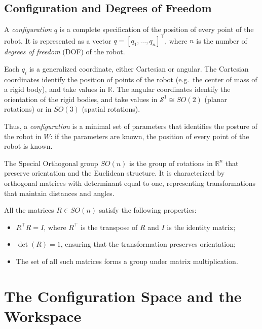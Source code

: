 \subsection{Configuration and Degrees of Freedom}
\label{sec:configuration-dof}

\begin{definition}[Configuration]
A \emph{configuration} \( q \) is a complete specification of the
position of every point of the robot. It is represented as a vector
\( q = [q_1, \dots, q_n]^\top \), where \( n \) is the number of
\emph{degrees of freedom} (DOF) of the robot.
\end{definition}

Each \( q_i \) is a generalized coordinate, either Cartesian or
angular. The Cartesian coordinates identify the position of points of
the robot (e.g.\ the center of mass of a rigid body), and take values
in \( \mathbb{R} \). The angular coordinates identify the orientation
of the rigid bodies, and take values in \( \mathcal{S}^1 \cong SO(2) \)
(planar rotations) or in \( SO(3) \) (spatial rotations).

Thus, a \emph{configuration} is a minimal set of parameters that identifies the posture of the robot
in \( W \): if the parameters are known, the position of every point of
the robot is known.

\begin{nb}
The Special Orthogonal group \( SO(n) \) is the group of rotations in
\( \mathbb{R}^n \) that preserve orientation and the Euclidean structure.
It is characterized by orthogonal matrices with determinant equal to one,
representing transformations that maintain distances and angles.

All the matrices \( R \in SO(n) \) satisfy the following properties:
\begin{itemize}
    \item \( R^\top R = I \), where \( R^\top \) is the transpose of \( R \) and
          \( I \) is the identity matrix;
    \item \( \det(R) = 1 \), ensuring that the transformation preserves
          orientation;
    \item The set of all such matrices forms a group under matrix
          multiplication.
\end{itemize}
\end{nb}

\section{The Configuration Space and the Workspace}
\label{sec:cspace-definition}

